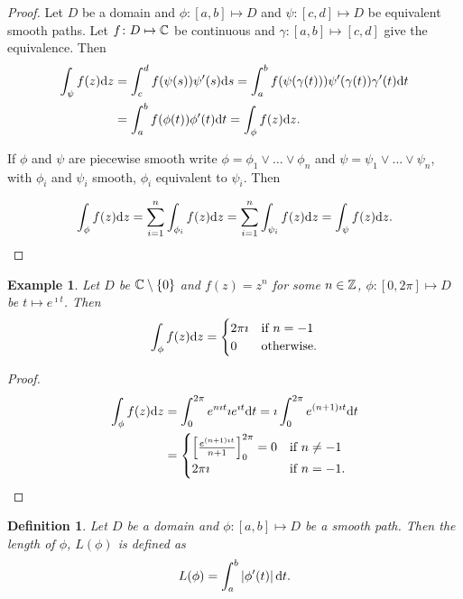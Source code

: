 \documentclass{notes}
\theoremstyle{plain}
\newtheorem{definition}[proposition]{Definition}
\newtheorem*{example}{Example}
\begin{document}
\begin{proof}
Let $D$ be a domain and $\phi \colon [a,b] \mapsto D$ and $\psi \colon [c,d] \mapsto
D$ be equivalent smooth paths.  Let $f \colon D \mapsto \mathbb{C}$ be continuous and
$\gamma \colon [a,b] \mapsto [c,d]$ give the equivalence.  Then
\begin{align*}
\int_\psi f(z) \mathrm{d} z &= \int_c^d f(\psi(s)) \psi'(s) \mathrm{d} s =
\int_a^b f(\psi(\gamma(t))) \psi'(\gamma(t)) \gamma'(t) \mathrm{d} t \\
&= \int_a^b f(\phi(t)) \phi'(t) \mathrm{d} t = \int_\phi f(z) \mathrm{d} z.
\end{align*}

If $\phi$ and $\psi$ are piecewise smooth write $\phi = \phi_1 \vee \dots
\vee \phi_n$ and $\psi = \psi_1 \vee \dots \vee \psi_n$, with $\phi_i$ and
$\psi_i$ smooth, $\phi_i$ equivalent to $\psi_i$.  Then

\[
\int_\phi f(z) \mathrm{d} z = \sum_{i=1}^n \int_{\phi_i} f(z) \mathrm{d} z
= \sum_{i=1}^n \int_{\psi_i} f(z) \mathrm{d} z = \int_\psi f(z) \mathrm{d} z.
\]
\end{proof}

\begin{example}
Let $D$ be $\mathbb{C} \setminus \{ 0 \}$ and $f(z) = z^n$ for some $n \in \mathbb{Z}$, 
$\phi \colon [0,2 \pi ] \mapsto D$ be $t \mapsto e^{\imath t}$.  Then
\[
\int_\phi f(z) \mathrm{d} z = 
\begin{cases}
2 \pi \imath & \text{if } n = -1 \\
0 & \text{otherwise.}
\end{cases}
\]
\end{example}

\begin{proof}
\begin{align*}
\int_\phi f(z) \mathrm{d} z &= \int_0^{2 \pi} e^{n \imath t} \imath e^{\imath t} \mathrm{d} t 
= \imath \int_0^{2 \pi} e^{(n+1) \imath t} \mathrm{d} t \\
&= \begin{cases}
\left[ \frac{e^{(n+1) \imath t}}{n+1} \right]_0^{2 \pi} = 0 & \text{if }
n \neq -1 \\
2 \pi \imath & \text{if } n = -1.
\end{cases}
\end{align*}
\end{proof}

\begin{definition}
Let $D$ be a domain and $\phi \colon [a,b] \mapsto D$ be a smooth path.  Then
the length of $\phi$, $L(\phi)$ is defined as
\[
L(\phi) = \int_a^b \left|\phi'(t)\right| \mathrm{d} t.
\]
\end{definition}
\end{document}
